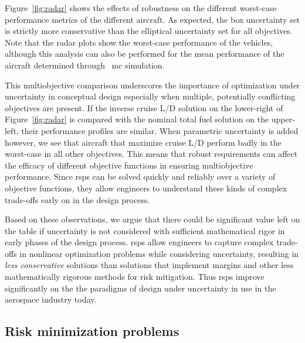 Figure~\ref{fig:radar} shows the effects of robustness on
the different worst-case performance metrics of the different aircraft.
As expected, the box uncertainty set is strictly more conservative than the elliptical uncertainty set for
all objectives. Note that the radar plots show the worst-case performance of the vehicles, although
this analysis can also be performed for the mean performance
of the aircraft determined through ~\gls{mc} simulation.

This multiobjective comparison underscores the importance of optimization under uncertainty
in conceptual design especially when multiple, potentially conflicting objectives are present.
If the inverse cruise L/D solution
on the lower-right of Figure~\ref{fig:radar} is compared with the nominal total fuel solution on the upper-left, their
performance profiles are similar. When parametric uncertainty is added however, we see that aircraft
that maximize cruise L/D perform badly in the worst-case
in all other objectives. This means that robust requirements can
affect the efficacy of different objective functions in ensuring multiobjective performance.
Since \gls{rsp}s can be solved quickly and reliably over a variety of objective functions,
they allow engineers to understand these kinds of complex trade-offs early on in the design process.

Based on these observations, we argue that there could be significant value left on the table
if uncertainty is not considered with sufficient mathematical rigor in early phases of
the design process. \gls{rsp}s allow engineers to capture complex
trade-offs in nonlinear optimization problems while considering uncertainty,
resulting in \emph{less conservative} solutions
than solutions that implement margins and other less mathematically
rigorous methods for risk mitigation.
Thus \gls{rsp}s improve significantly on the
the paradigms of design under uncertainty in use
in the aerospace industry today.

\subsection{Risk minimization problems}

